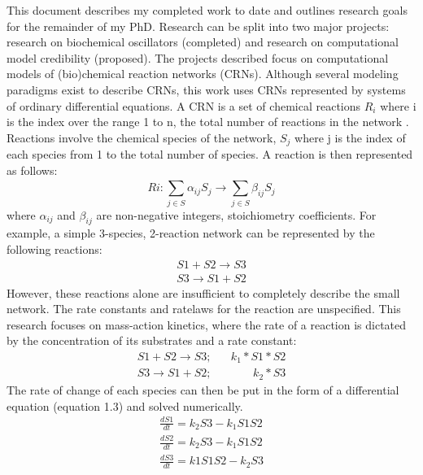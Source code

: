 \documentclass[12pt]{report}
\begin{document}
This document describes my completed work to date and outlines research goals for the remainder of my PhD. Research can be split into two major projects: research on biochemical oscillators (completed) and research on computational model credibility (proposed). 
The projects described focus on computational models of (bio)chemical reaction networks (CRNs). Although several modeling paradigms exist to describe CRNs, this work uses CRNs represented by systems of ordinary differential equations. A CRN is a set of chemical reactions $R_i$ where i is the index over the range 1 to n, the total number of reactions in the network . Reactions involve the chemical species of the network, $S_j$ where j is the index of each species from 1 to the total number of species. A reaction is then represented as follows:
\begin{equation*}
Ri: \sum_{j\in S}^{}\alpha_{ij}S_j\to \sum_{j\in S}^{}\beta_{ij}S_j
\end{equation*}
where $\alpha_{ij}$ and $\beta_{ij}$ are non-negative integers, stoichiometry coefficients. For example, a simple 3-species, 2-reaction network can be represented by the following reactions:
\begin{equation}
\begin{split}
S1 + S2 \to S3 \\
S3 \to S1 + S2
\end{split}
\end{equation}
However, these reactions alone are insufficient to completely describe the small network. The rate constants and ratelaws for the reaction are unspecified. This research focuses on mass-action kinetics, where the rate of a reaction is dictated by the concentration of its substrates and a rate constant:
\begin{equation}
\begin{split}
S1 + S2 \to S3; \;\;\;\;\;\; k_1*S1*S2\\
S3 \to S1 + S2; \;\;\;\;\;\;\;\;\;\;\;\;\; k_2*S3
\end{split}
\end{equation}
The rate of change of each species can then be put in the form of a differential equation (equation 1.3) and solved numerically.
\begin{equation}
\begin{split}
\frac{dS1}{dt}=k_2S3 - k_1S1S2\\
\frac{dS2}{dt}=k_2S3 -k_1S1S2\\
\frac{dS3}{dt}=k1S1S2 - k_2S3
\end{split}
\end{equation}
\end{document}
